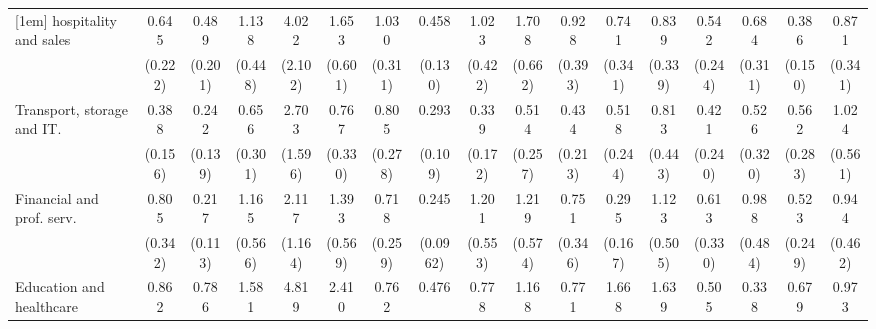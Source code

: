 {\begin{tabular}{l*{16}{c}}
[1em]
hospitality and sales&       0.645         &       0.489         &       1.138         &       4.022\sym{**} &       1.653         &       1.030         &       0.458\sym{**} &       1.023         &       1.708         &       0.928         &       0.741         &       0.839         &       0.542         &       0.684         &       0.386\sym{*}  &       0.871         \\
                    &     (0.222)         &     (0.201)         &     (0.448)         &     (2.102)         &     (0.601)         &     (0.311)         &     (0.130)         &     (0.422)         &     (0.662)         &     (0.393)         &     (0.341)         &     (0.339)         &     (0.244)         &     (0.311)         &     (0.150)         &     (0.341)         \\
[1em]
Transport, storage and IT.&       0.388\sym{*}  &       0.242\sym{*}  &       0.656         &       2.703         &       0.767         &       0.805         &       0.293\sym{***}&       0.339\sym{*}  &       0.514         &       0.434         &       0.518         &       0.813         &       0.421         &       0.526         &       0.562         &       1.024         \\
                    &     (0.156)         &     (0.139)         &     (0.301)         &     (1.596)         &     (0.330)         &     (0.278)         &     (0.109)         &     (0.172)         &     (0.257)         &     (0.213)         &     (0.244)         &     (0.443)         &     (0.240)         &     (0.320)         &     (0.283)         &     (0.561)         \\
[1em]
Financial and prof. serv.&       0.805         &       0.217\sym{**} &       1.165         &       2.117         &       1.393         &       0.718         &       0.245\sym{***}&       1.201         &       1.219         &       0.751         &       0.295\sym{*}  &       1.123         &       0.613         &       0.988         &       0.523         &       0.944         \\
                    &     (0.342)         &     (0.113)         &     (0.566)         &     (1.164)         &     (0.569)         &     (0.259)         &    (0.0962)         &     (0.553)         &     (0.574)         &     (0.346)         &     (0.167)         &     (0.505)         &     (0.330)         &     (0.484)         &     (0.249)         &     (0.462)         \\
[1em]
Education and healthcare&       0.862         &       0.786         &       1.581         &       4.819\sym{**} &       2.410\sym{*}  &       0.762         &       0.476         &       0.778         &       1.168         &       0.771         &       1.668         &       1.639         &       0.505         &       0.338\sym{*}  &       0.679         &       0.973         \\

\end{tabular}}
